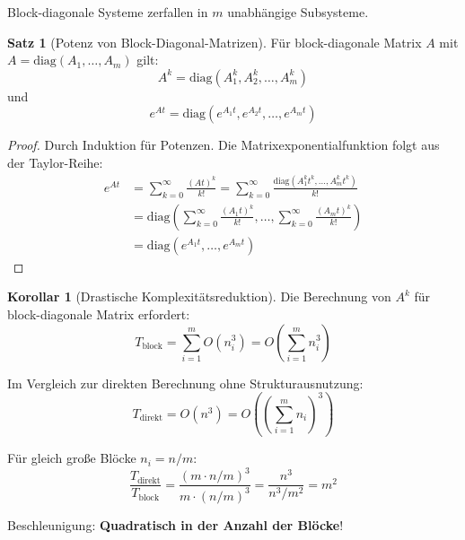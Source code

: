 ﻿\documentclass[a4paper,12pt]{report}
\theoremstyle{definition}
\newtheorem{satz}{Satz}
\newtheorem{korollar}{Korollar}
\begin{document}
	Block-diagonale Systeme zerfallen in $m$ unabhängige Subsysteme.
	
	\begin{satz}[Potenz von Block-Diagonal-Matrizen]
		Für block-diagonale Matrix $A$ mit $A = \text{diag}(A_1, \ldots, A_m)$ gilt:
		\[
		A^k = \text{diag}(A_1^k, A_2^k, \ldots, A_m^k)
		\]
		und
		\[
		e^{At} = \text{diag}(e^{A_1 t}, e^{A_2 t}, \ldots, e^{A_m t})
		\]
	\end{satz}
	
	\begin{proof}
		Durch Induktion für Potenzen. Die Matrixexponentialfunktion folgt aus der Taylor-Reihe:
		\begin{align}
			e^{At} &= \sum_{k=0}^\infty \frac{(At)^k}{k!} = \sum_{k=0}^\infty \frac{\text{diag}(A_1^k t^k, \ldots, A_m^k t^k)}{k!} \\
			&= \text{diag}\left(\sum_{k=0}^\infty \frac{(A_1 t)^k}{k!}, \ldots, \sum_{k=0}^\infty \frac{(A_m t)^k}{k!}\right) \\
			&= \text{diag}(e^{A_1 t}, \ldots, e^{A_m t})
		\end{align}
	\end{proof}
	
	\begin{korollar}[Drastische Komplexitätsreduktion]
		Die Berechnung von $A^k$ für block-diagonale Matrix erfordert:
		\[
		T_{\text{block}} = \sum_{i=1}^m O(n_i^3) = O\left(\sum_{i=1}^m n_i^3\right)
		\]
		
		Im Vergleich zur direkten Berechnung ohne Strukturausnutzung:
		\[
		T_{\text{direkt}} = O(n^3) = O\left(\left(\sum_{i=1}^m n_i\right)^3\right)
		\]
		
		Für gleich große Blöcke $n_i = n/m$:
		\[
		\frac{T_{\text{direkt}}}{T_{\text{block}}} = \frac{(m \cdot n/m)^3}{m \cdot (n/m)^3} = \frac{n^3}{n^3/m^2} = m^2
		\]
		
		Beschleunigung: \textbf{Quadratisch in der Anzahl der Blöcke}!
	\end{korollar}
	
\end{document}
